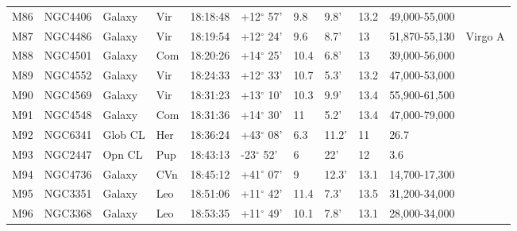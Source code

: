\begin{longtable}{@{}lllllllllll@{}}
M86        & NGC4406     & Galaxy     & Vir       & 18:18:48 & +12$^{\circ}$ 57'  & 9.8       & 9.8'                 & 13.2     & 49,000-55,000       &                                           \\
M87        & NGC4486     & Galaxy     & Vir       & 18:19:54 & +12$^{\circ}$ 24'  & 9.6       & 8.7'                 & 13       & 51,870-55,130       & Virgo A                                   \\
M88        & NGC4501     & Galaxy     & Com       & 18:20:26 & +14$^{\circ}$ 25'  & 10.4      & 6.8'                 & 13       & 39,000-56,000       &                                           \\
M89        & NGC4552     & Galaxy     & Vir       & 18:24:33 & +12$^{\circ}$ 33'  & 10.7      & 5.3'                 & 13.2     & 47,000-53,000       &                                           \\
M90        & NGC4569     & Galaxy     & Vir       & 18:31:23 & +13$^{\circ}$ 10'  & 10.3      & 9.9'                 & 13.4     & 55,900-61,500       &                                           \\
M91        & NGC4548     & Galaxy     & Com       & 18:31:36 & +14$^{\circ}$ 30'  & 11        & 5.2'                 & 13.4     & 47,000-79,000       &                                           \\
M92        & NGC6341     & Glob CL    & Her       & 18:36:24 & +43$^{\circ}$ 08'  & 6.3       & 11.2'                & 11       & 26.7                &                                           \\
M93        & NGC2447     & Opn CL     & Pup       & 18:43:13 & -23$^{\circ}$ 52'  & 6         & 22'                  & 12       & 3.6                 &                                           \\
M94        & NGC4736     & Galaxy     & CVn       & 18:45:12 & +41$^{\circ}$ 07'  & 9         & 12.3'                & 13.1     & 14,700-17,300       &                                           \\
M95        & NGC3351     & Galaxy     & Leo       & 18:51:06 & +11$^{\circ}$ 42'  & 11.4      & 7.3'                 & 13.5     & 31,200-34,000       &                                           \\
M96        & NGC3368     & Galaxy     & Leo       & 18:53:35 & +11$^{\circ}$ 49'  & 10.1      & 7.8'                 & 13.1     & 28,000-34,000       &                                           \\

\end{longtable}
